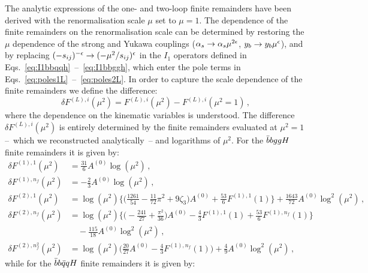 \documentclass[main.tex]{subfiles}
\begin{document}
The analytic expressions of the one- and two-loop finite remainders have been derived with the renormalisation scale $\mu$ set to $\mu  = 1$. 
The dependence of the finite remainders on the renormalisation scale can be determined by restoring the $\mu$ dependence of the strong and Yukawa couplings ($\alpha_s \rightarrow \alpha_s \mu^{2\epsilon}$, 
$y_b \rightarrow y_b \mu^{\epsilon}$), and by replacing $(-s_{ij})^{-\epsilon} \rightarrow (-\mu^2/s_{ij})^\epsilon$ in the $I_1$ operators defined in Eqs.~\ref{eq:I1bbqqh}~--~\ref{eq:I1bbggh}, which enter the pole terms in Eqs.~\ref{eq:poles1L}~--~\ref{eq:poles2L}. In order to capture the scale dependence of the finite remainders we define the difference:
\begin{equation}
\delta F^{(L),i}(\mu^2) = F^{(L),i}(\mu^2) - F^{(L),i}(\mu^2 = 1) \,,
\end{equation}
where the dependence on the kinematic variables is understood.
The difference $\delta F^{(L),i}(\mu^2)$ is entirely determined by the finite remainders evaluated at $\mu^2=1$ --~which we reconstructed analytically~-- and logarithms of $\mu^2$.
For the $\bar{b}bggH$ finite remainders it is given by:
\begingroup
\allowdisplaybreaks
\begin{align}
\delta F^{(1),1}(\mu^2)   & = \frac{31}{6} A^{(0)} \log(\mu^2) \,, \\
\delta F^{(1),n_f}(\mu^2) & = - \frac{2}{3} A^{(0)} \log(\mu^2) \,, \\
\delta F^{(2),1}(\mu^2) & = \log(\mu^2) \bigg\lbrace \bigg(\frac{1261}{54} - \frac{11}{72}\pi^2 + 9 \zeta_3\bigg) A^{(0)} + \frac{53}{6}F^{(1),1}(1) \bigg\rbrace
                             + \frac{1643}{72} A^{(0)} \log^2(\mu^2) \,, \\
\delta F^{(2),n_f}(\mu^2) & = \log(\mu^2) \bigg\lbrace \bigg(-\frac{241}{27} + \frac{\pi^2}{36} \bigg) A^{(0)} 
                                                                 - \frac{4}{3}F^{(1),1}(1)  + \frac{53}{6}F^{(1),n_f}(1) \bigg\rbrace \nonumber \\
                            & \quad - \frac{115}{18} A^{(0)} \log^2(\mu^2)  \,, \\
\delta F^{(2),n_f^2}(\mu^2) & = \log(\mu^2)\bigg(\frac{20}{27} A^{(0)} - \frac{4}{3} F^{(1),n_f}(1)\bigg) + \frac{4}{9} A^{(0)} \log^2(\mu^2) \,, 
\end{align}
\endgroup
while for the $\bar{b}b\bar{q}qH$ finite remainders it is given by:
\begingroup
\allowdisplaybreaks
\end{document}
